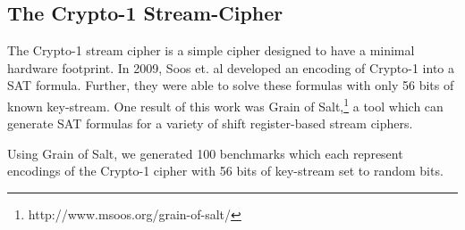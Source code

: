 \subsection{The Crypto-1 Stream-Cipher}
\label{sec:encoding:crypto1}

The Crypto-1 stream cipher is a simple cipher designed to have a minimal hardware footprint. In 2009, Soos et. al \cite{SNC09} developed an encoding of Crypto-1 into a SAT formula. Further, they were able to solve these formulas with only 56 bits of known key-stream. One result of this work was Grain of Salt,\footnote{http://www.msoos.org/grain-of-salt/} a tool which can generate SAT formulas for a variety of shift register-based stream ciphers.

Using Grain of Salt, we generated 100 benchmarks which each represent encodings of the Crypto-1 cipher with 56 bits of key-stream set to random bits.
